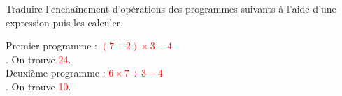 \begin{exercice*}%
    Traduire l'enchaînement d'opérations des programmes suivants à l'aide d'une expression puis les calculer.
    \setlength{\columnseprule}{0pt}
    \begin{multicols}{2}
    \end{multicols}
 \end{exercice*}
 
 \begin{corrige}
    Premier programme : \textcolor{red}{$(7 + 2)\times3-4$} \\ [1mm]
    . On trouve \textcolor{red}{24}. \\
    Deuxième programme :  \textcolor{red}{$6\times7\div3-4$} \\ [1mm]
    . On trouve \textcolor{red}{10}.
 \end{corrige}